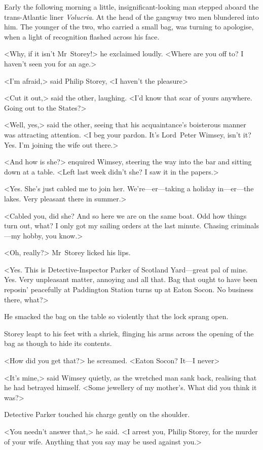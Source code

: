 \divider
Early the following morning a little, insignificant-looking man stepped aboard the trans-Atlantic liner \textit{Volucria}. At the head of the gangway two men blundered into him. The younger of the two, who carried a small bag, was turning to apologise, when a light of recognition flashed across his face.

<Why, if it isn't Mr~Storey!> he exclaimed loudly. <Where are you off to? I haven't seen you for an age.>

<I'm afraid,> said Philip Storey, <I haven't the pleasure\longdash>

<Cut it out,> said the other, laughing. <I'd know that scar of yours anywhere. Going out to the States?>

<Well, yes,> said the other, seeing that his acquaintance's boisterous manner was attracting attention. <I beg your pardon. It's Lord~Peter Wimsey, isn't it? Yes. I'm joining the wife out there.>

<And how is she?> enquired Wimsey, steering the way into the bar and sitting down at a table. <Left last week didn't she? I saw it in the papers.>

<Yes. She's just cabled me to join her. We're—er—taking a holiday in—er—the lakes. Very pleasant there in summer.>

<Cabled you, did she? And so here we are on the same boat. Odd how things turn out, what? I only got my sailing orders at the last minute. Chasing criminals—my hobby, you know.>

<Oh, really?> Mr~Storey licked his lips.

<Yes. This is Detective-Inspector Parker of Scotland Yard—great pal of mine. Yes. Very unpleasant matter, annoying and all that. Bag that ought to have been reposin' peacefully at Paddington Station turns up at Eaton Socon. No business there, what?>

He smacked the bag on the table so violently that the lock sprang open.

Storey leapt to his feet with a shriek, flinging his arms across the opening of the bag as though to hide its contents.

<How did you get that?> he screamed. <Eaton Socon? It—I never\longdash>

<It's mine,> said Wimsey quietly, as the wretched man sank back, realising that he had betrayed himself. <Some jewellery of my mother's. What did you think it was?>

Detective Parker touched his charge gently on the shoulder.

<You needn't answer that,> he said. <I arrest you, Philip Storey, for the murder of your wife. Anything that you say may be used against you.>